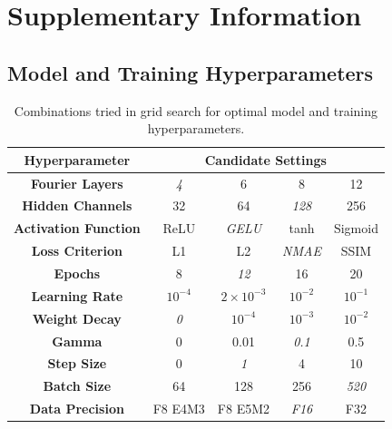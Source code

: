 \documentclass[preprint,review,12pt,numafflabel]{elsarticle}
\begin{document}

% 


\clearpage
\appendix

\renewcommand{\thesection}{S\arabic{section}}
\renewcommand{\thesubsection}{S\arabic{section}.\arabic{subsection}}
\renewcommand{\thefigure}{S\arabic{figure}}
\renewcommand{\thetable}{S\arabic{table}}
\renewcommand{\theequation}{S\arabic{equation}}

\setcounter{figure}{0}
\setcounter{table}{0}
\setcounter{equation}{0}

\section{Supplementary Information}
\label{sec:supplement}
\subsection{Model and Training Hyperparameters}
\begin{table}[H]
    \centering
    \begin{tabular}{|c|c|c|c|c|}
        \hline
        \textbf{Hyperparameter} &
        \multicolumn{4}{c|}{\textbf{Candidate Settings}} \\ \hline
    
        \textbf{Fourier Layers} & \textit{4} & 6 & 8 & 12 \\ \hline
        \textbf{Hidden Channels} & 32 & 64 & \textit{128} & 256 \\ \hline
        \textbf{Activation Function} & ReLU & \textit{GELU} & tanh & Sigmoid \\ \hline
        \textbf{Loss Criterion} & L1 & L2 & \textit{NMAE} & SSIM \\ \hline
        \textbf{Epochs} & 8 & \textit{12} & 16 & 20 \\ \hline
        \textbf{Learning Rate} & $10^{-4}$ & \textit{$2\times10^{-3}$} & $10^{-2}$ & $10^{-1}$ \\ \hline
        \textbf{Weight Decay} & \textit{0} & $10^{-4}$ & $10^{-3}$ & $10^{-2}$ \\ \hline
        \textbf{Gamma} & 0 & 0.01 & \textit{0.1} & 0.5 \\ \hline
        \textbf{Step Size} & 0 & \textit{1} & 4 & 10 \\ \hline
        \textbf{Batch Size} & 64 & 128 & 256 & \textit{520} \\ \hline
        \textbf{Data Precision} & F8 E4M3 & F8 E5M2 & \textit{F16} & F32 \\ \hline
    \end{tabular}
    \caption{Combinations tried in grid search for optimal model and training hyperparameters.}
    \label{tab:training_hyperparameters}
\end{table}
\end{document}
